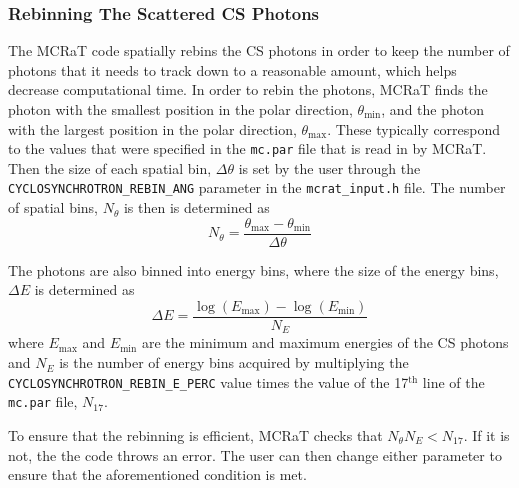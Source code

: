\documentclass[12pt,a4paper]{article}
\begin{document}
\subsubsection{Rebinning The Scattered CS Photons}
The MCRaT code spatially rebins the CS photons in order to keep the number of photons that it needs to track down to a reasonable amount, which helps decrease computational time. In order to rebin the photons, MCRaT finds the photon with the smallest position in the polar direction, $\theta_\mathrm{min}$,  and the photon with the largest position in the polar direction, $\theta_\mathrm{max}$. These typically correspond to the values that were specified in the \texttt{mc.par} file that is read in by MCRaT. Then the size of each spatial bin, $\Delta \theta$ is set by the user through the \texttt{CYCLOSYNCHROTRON\_REBIN\_ANG} parameter in the \texttt{mcrat\_input.h} file. The number of spatial bins, $N_\theta$ is then is determined as
\begin{equation}
N_\theta=\frac{\theta_\mathrm{max}-\theta_\mathrm{min}}{\Delta \theta}
\end{equation}

The photons are also binned into energy bins, where the size of the energy bins, $\Delta E$ is determined as 
\begin{equation}
\Delta E=\frac{\log(E_\mathrm{max})-\log(E_\mathrm{min})}{N_E}
\end{equation}
where $E_\mathrm{max}$ and $E_\mathrm{min}$ are the minimum and maximum energies of the CS photons and $N_E$ is the number of energy bins acquired by multiplying the \texttt{CYCLOSYNCHROTRON\_REBIN\_E\_PERC} value times the value of the 17$^\textrm{th}$ line of the \texttt{mc.par} file, $N_{17}$.

To ensure that the rebinning is efficient, MCRaT checks that $N_\theta N_E<N_{17}$. If it is not, the the code throws an error. The user can then change either parameter to ensure that the aforementioned condition is met.
\end{document}
